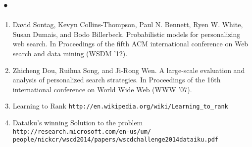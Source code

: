 \documentclass[11pt]{article}
\begin{document}
\subsection*{•}
\vspace{-5mm}
\begin{enumerate}\setlength{\itemsep}{-5pt}
\item David Sontag, Kevyn Collins-Thompson, Paul N. Bennett, Ryen W. White, Susan Dumais, and Bodo Billerbeck. Probabilistic models for personalizing web search. In Proceedings of the fifth ACM international conference on Web search and data mining (WSDM '12).
\item Zhicheng Dou, Ruihua Song, and Ji-Rong Wen.  A large-scale evaluation and analysis of personalized search strategies. In Proceedings of the 16th international conference on World Wide Web (WWW '07).
\item Learning to Rank \texttt{http://en.wikipedia.org/wiki/Learning\_to\_rank}
\item Dataiku's winning Solution to the problem \texttt{http://research.microsoft.com/en-us/um/ \\ people/nickcr/wscd2014/papers/wscdchallenge2014dataiku.pdf}

\end{enumerate}
\end{document}
